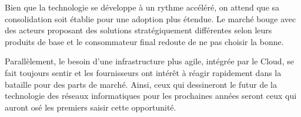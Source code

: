 Bien que la technologie se développe à un rythme accéléré, on attend que sa consolidation soit établie pour une adoption plus étendue. Le marché bouge avec des acteurs proposant des solutions stratégiquement différentes selon leurs produits de base et le consommateur final redoute de ne pas choisir la bonne.

Parallèlement, le besoin d'une infrastructure plus agile, intégrée par le Cloud, se fait toujours sentir et les fournisseurs ont intérêt à réagir rapidement dans la bataille pour des parts de marché. Ainsi, ceux qui dessineront le futur de la technologie des réseaux informatiques pour les prochaines années seront ceux qui auront osé les premiers saisir cette opportunité.

